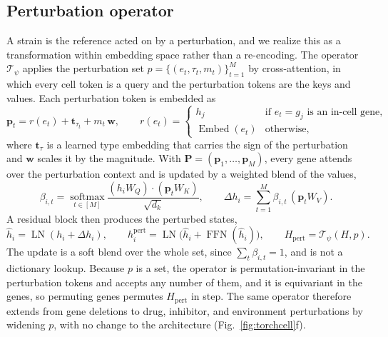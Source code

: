 \subsection*{Perturbation operator}
A strain is the reference acted on by a perturbation, and we realize this as a
transformation within embedding space rather than a re-encoding. The operator
$\mathcal{T}_\psi$ applies the perturbation set $p=\{(e_t,\tau_t,m_t)\}_{t=1}^{M}$ by
cross-attention, in which every cell token is a query and the perturbation tokens are the
keys and values. Each perturbation token is embedded as
\begin{equation}
\mathbf{p}_t=r(e_t)+\mathbf{t}_{\tau_t}+m_t\,\mathbf{w},
\qquad
r(e_t)=
\begin{cases}
h_j & \text{if } e_t=g_j \text{ is an in-cell gene,}\\
\operatorname{Embed}(e_t) & \text{otherwise,}
\end{cases}
\label{eq:ptoken}
\end{equation}
where $\mathbf{t}_{\tau}$ is a learned type embedding that carries the sign of the
perturbation and $\mathbf{w}$ scales it by the magnitude. With $\mathbf{P}=(\mathbf{p}_1,\dots,\mathbf{p}_M)$, every
gene attends over the perturbation context and is updated by a weighted blend of the
values,
\begin{equation}
\beta_{i,t}=\operatorname*{softmax}_{t\in[M]}\frac{(h_iW_Q)\cdot(\mathbf{p}_tW_K)}{\sqrt{d_k}},
\qquad
\Delta h_i=\sum_{t=1}^{M}\beta_{i,t}\,(\mathbf{p}_tW_V).
\label{eq:pert}
\end{equation}
A residual block then produces the perturbed states,
\begin{equation}
\hat h_i=\operatorname{LN}(h_i+\Delta h_i),
\qquad
h_i^{\mathrm{pert}}=\operatorname{LN}\!\big(\hat h_i+\operatorname{FFN}(\hat h_i)\big),
\qquad
H_{\mathrm{pert}}=\mathcal{T}_\psi(H,p).
\label{eq:pertblock}
\end{equation}
The update is a soft blend over the whole set, since $\sum_t\beta_{i,t}=1$, and is not a
dictionary lookup. Because $p$ is a set, the operator is permutation-invariant in the
perturbation tokens and accepts any number of them, and it is equivariant in the genes, so
permuting genes permutes $H_{\mathrm{pert}}$ in step. The same operator therefore extends
from gene deletions to drug, inhibitor, and environment perturbations by widening $p$,
with no change to the architecture (Fig.~\ref{fig:torchcell}f).


